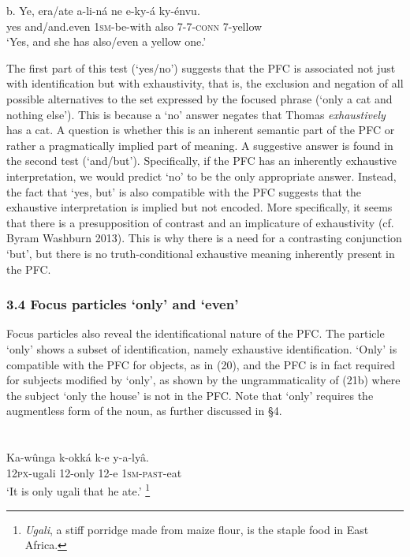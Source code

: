 \documentclass[output=paper]{langsci/langscibook}
\begin{document}
\gll   b.  Ye,  era/ate  a-li-ná  ne  e-ky-á    ky-énvu.\\
         yes  and/and.even  \textsc{1sm}{}-be-with  also  \textsc{7}{}-\textsc{7}{}-\textsc{conn}  7-yellow\\
\glt     ‘Yes, and she has also/even a yellow one.’
\z

The first part of this test (‘yes/no’) suggests that the PFC is associated not just with identification but with exhaustivity, that is, the exclusion and negation of all possible alternatives to the set expressed by the focused phrase (‘only a cat and nothing else’). This is because a ‘no’ answer negates that Thomas \textit{exhaustively} has a cat. A question is whether this is an inherent semantic part of the PFC or rather a pragmatically implied part of meaning. A suggestive answer is found in the second test (‘and/but’). Specifically, if the PFC has an inherently exhaustive interpretation, we would predict ‘no’ to be the only appropriate answer. Instead, the fact that ‘yes, but’ is also compatible with the PFC suggests that the exhaustive interpretation is implied but not encoded. More specifically, it seems that there is a presupposition of contrast and an implicature of exhaustivity (cf. Byram Washburn 2013). This is why there is a need for a contrasting conjunction ‘but’, but there is no truth-conditional exhaustive meaning inherently present in the PFC. 

\subsection{ \label{bkm:Ref324612038}3.4 Focus particles ‘only’ and ‘even’}

Focus particles also reveal the identificational nature of the PFC. The particle ‘only’ shows a subset of identification, namely exhaustive identification. ‘Only’ is compatible with the PFC for objects, as in (20), and the PFC is in fact required for subjects modified by ‘only’, as shown by the ungrammaticality of (21b) where the subject ‘only the house’ is not in the PFC. Note that ‘only’ requires the augmentless form of the noun, as further discussed in §4.

\chapter{}
\gll   Ka-wûnga  k-okká    k-e  y-a-lyâ.{ }\\
       \textsc{12px}{}-ugali  12-only  12-e  \textsc{1sm}{}-\textsc{past}{}-eat\\
\glt   ‘It is only ugali that he ate.’{ }\footnote{ \textit{Ugali}, a stiff porridge made from maize flour, is the staple food in East Africa.}
\z
\end{document}
